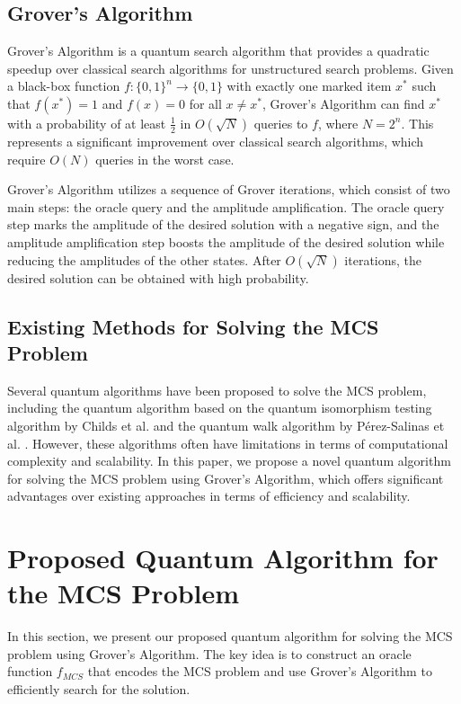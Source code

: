 \subsection{Grover's Algorithm}

Grover's Algorithm \cite{grover1996fast} is a quantum search algorithm that provides a quadratic speedup over classical search algorithms for unstructured search problems. Given a black-box function $f: \{0, 1\}^n \rightarrow \{0, 1\}$ with exactly one marked item $x^*$ such that $f(x^*) = 1$ and $f(x) = 0$ for all $x \neq x^*$, Grover's Algorithm can find $x^*$ with a probability of at least $\frac{1}{2}$ in $O(\sqrt{N})$ queries to $f$, where $N = 2^n$. This represents a significant improvement over classical search algorithms, which require $O(N)$ queries in the worst case.

Grover's Algorithm utilizes a sequence of Grover iterations, which consist of two main steps: the oracle query and the amplitude amplification. The oracle query step marks the amplitude of the desired solution with a negative sign, and the amplitude amplification step boosts the amplitude of the desired solution while reducing the amplitudes of the other states. After $O(\sqrt{N})$ iterations, the desired solution can be obtained with high probability.

\subsection{Existing Methods for Solving the MCS Problem}

Several quantum algorithms have been proposed to solve the MCS problem, including the quantum algorithm based on the quantum isomorphism testing algorithm by Childs et al. \cite{childs2019quantum} and the quantum walk algorithm by P\'{e}rez-Salinas et al. \cite{perez2019quantum}. However, these algorithms often have limitations in terms of computational complexity and scalability. In this paper, we propose a novel quantum algorithm for solving the MCS problem using Grover's Algorithm, which offers significant advantages over existing approaches in terms of efficiency and scalability.

\section{Proposed Quantum Algorithm for the MCS Problem} \label{sec:proposed_algorithm}

In this section, we present our proposed quantum algorithm for solving the MCS problem using Grover's Algorithm. The key idea is to construct an oracle function $f_{MCS}$ that encodes the MCS problem and use Grover's Algorithm to efficiently search for the solution.

